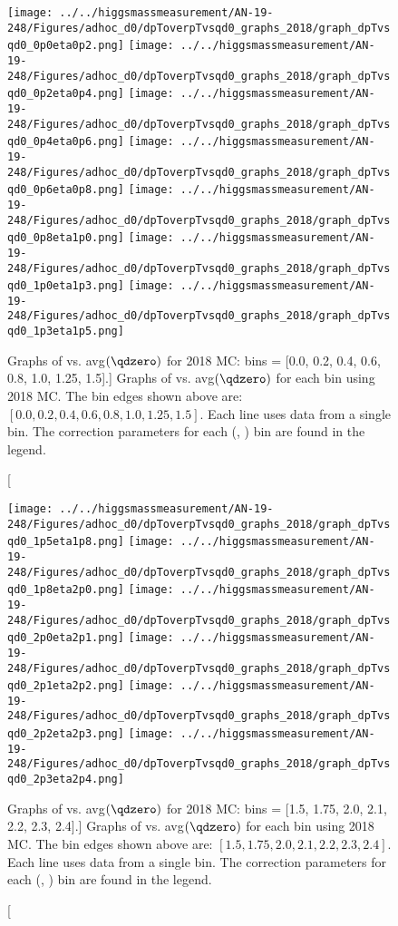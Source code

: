 \newpage
\begin{figure}[!htbp]
    \centering
    { \texttt{[image: ../../higgsmassmeasurement/AN-19-248/Figures/adhoc\_d0/dpToverpTvsqd0\_graphs\_2018/graph\_dpTvsqd0\_0p0eta0p2.png]}}
    { \texttt{[image: ../../higgsmassmeasurement/AN-19-248/Figures/adhoc\_d0/dpToverpTvsqd0\_graphs\_2018/graph\_dpTvsqd0\_0p2eta0p4.png]}}
    { \texttt{[image: ../../higgsmassmeasurement/AN-19-248/Figures/adhoc\_d0/dpToverpTvsqd0\_graphs\_2018/graph\_dpTvsqd0\_0p4eta0p6.png]}}
    { \texttt{[image: ../../higgsmassmeasurement/AN-19-248/Figures/adhoc\_d0/dpToverpTvsqd0\_graphs\_2018/graph\_dpTvsqd0\_0p6eta0p8.png]}}
    { \texttt{[image: ../../higgsmassmeasurement/AN-19-248/Figures/adhoc\_d0/dpToverpTvsqd0\_graphs\_2018/graph\_dpTvsqd0\_0p8eta1p0.png]}}
    { \texttt{[image: ../../higgsmassmeasurement/AN-19-248/Figures/adhoc\_d0/dpToverpTvsqd0\_graphs\_2018/graph\_dpTvsqd0\_1p0eta1p3.png]}}
    { \texttt{[image: ../../higgsmassmeasurement/AN-19-248/Figures/adhoc\_d0/dpToverpTvsqd0\_graphs\_2018/graph\_dpTvsqd0\_1p3eta1p5.png]}}
    \caption
        [Graphs of \pTmismeas vs. avg$(\qdzero)$ for 2018 MC: bins = [0.0, 0.2, 0.4, 0.6, 0.8, 1.0, 1.25, 1.5].]
        { 
        Graphs of \pTmismeas vs. avg$(\qdzero)$ for each \abseta bin using 2018 MC.
        The \abseta bin edges shown above are: $[0.0, 0.2, 0.4, 0.6, 0.8, 1.0, 1.25, 1.5]$.
        Each line uses data from a single \pT bin. 
        The \pT correction parameters for each (\abseta, \pT) bin are found in the legend.
        }
\end{figure}
\newpage
\begin{figure}[!htbp]
    \centering
    { \texttt{[image: ../../higgsmassmeasurement/AN-19-248/Figures/adhoc\_d0/dpToverpTvsqd0\_graphs\_2018/graph\_dpTvsqd0\_1p5eta1p8.png]}}
    { \texttt{[image: ../../higgsmassmeasurement/AN-19-248/Figures/adhoc\_d0/dpToverpTvsqd0\_graphs\_2018/graph\_dpTvsqd0\_1p8eta2p0.png]}}
    { \texttt{[image: ../../higgsmassmeasurement/AN-19-248/Figures/adhoc\_d0/dpToverpTvsqd0\_graphs\_2018/graph\_dpTvsqd0\_2p0eta2p1.png]}}
    { \texttt{[image: ../../higgsmassmeasurement/AN-19-248/Figures/adhoc\_d0/dpToverpTvsqd0\_graphs\_2018/graph\_dpTvsqd0\_2p1eta2p2.png]}}
    { \texttt{[image: ../../higgsmassmeasurement/AN-19-248/Figures/adhoc\_d0/dpToverpTvsqd0\_graphs\_2018/graph\_dpTvsqd0\_2p2eta2p3.png]}}
    { \texttt{[image: ../../higgsmassmeasurement/AN-19-248/Figures/adhoc\_d0/dpToverpTvsqd0\_graphs\_2018/graph\_dpTvsqd0\_2p3eta2p4.png]}}
    \caption
        [Graphs of \pTmismeas vs. avg$(\qdzero)$ for 2018 MC: bins = [1.5, 1.75, 2.0, 2.1, 2.2, 2.3, 2.4].]
        { 
        Graphs of \pTmismeas vs. avg$(\qdzero)$ for each \abseta bin using 2018 MC.
        The \abseta bin edges shown above are: $[1.5, 1.75, 2.0, 2.1, 2.2, 2.3, 2.4]$.
        Each line uses data from a single \pT bin. 
        The \pT correction parameters for each (\abseta, \pT) bin are found in the legend.
    }
\end{figure}
